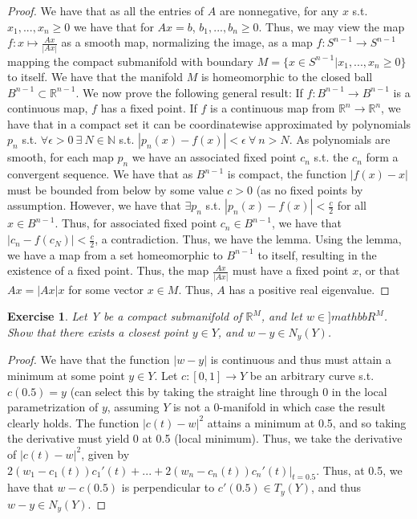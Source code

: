 \documentclass{article}
\newtheorem{exercise}{Exercise}
\begin{document}
  \begin{proof}
    We have that as all the entries of $A$ are nonnegative, for any $x$ s.t. $x_{1},...,x_{n} \geq 0$ we have that for $Ax = b$, $b_{1},...,b_{n} \geq 0$. Thus, we may view the map $f: x \mapsto \frac{Ax}{|Ax|}$ as a smooth map, normalizing the image, as a map $f:S^{n-1} \to S^{n-1}$ mapping the compact submanifold with boundary $M = \{x \in S^{n-1} | x_{1},...,x_{n} \geq 0\}$ to itself. We have that the manifold $M$ is homeomorphic to the closed ball $B^{n-1} \subset \mathbb{R}^{n-1}$. We now prove the following general result: If $f:B^{n-1} \to B^{n-1}$ is a continuous map, $f$ has a fixed point. \newline
    If $f$ is a continuous map from $\mathbb{R}^{n} \to \mathbb{R}^{n}$, we have that in a compact set it can be coordinatewise approximated by polynomials $p_{n}$ s.t. $\forall \epsilon > 0 \ \exists \ N \in \mathbb{N}$ s.t. $|p_{n}(x) - f(x)| < \epsilon \ \forall \ n > N$. As polynomials are smooth, for each map $p_{n}$ we have an associated fixed point $c_{n}$ s.t. the $c_{n}$ form a convergent sequence. We have that as $B^{n-1}$ is compact, the function $|f(x) - x|$ must be bounded from below by some value $c > 0$ (as no fixed points by assumption. However, we have that $\exists p_{n}$ s.t. $|p_{n}(x) - f(x)| < \frac{c}{2}$ for all $x \in B^{n-1}$. Thus, for associated fixed point $c_{n} \in B^{n-1}$, we have that $|c_{n} - f(c_{N})| < \frac{c}{2}$, a contradiction. Thus, we have the lemma.
    Using the lemma, we have a map from a set homeomorphic to $B^{n-1}$ to itself, resulting in the existence of a fixed point. Thus, the map $\frac{Ax}{|Ax|}$ must have a fixed point $x$, or that $Ax = |Ax|x$ for some vector $x \in M$. Thus, $A$ has a positive real eigenvalue. 
  \end{proof}

  \begin{exercise}
    Let Y be a compact submanifold of $\mathbb{R}^{M}$, and let $w \in ]mathbb{R}^{M}$. Show that there exists a closest point $y \in Y$, and $w-y \in N_{y}(Y)$.
    \end{exercise}
    \begin{proof}
      We have that the function $|w-y|$ is continuous and thus must attain a minimum at some point $y \in Y$. Let $c: [0,1] \to Y$ be an arbitrary curve s.t. $c(0.5) = y$ (can select this by taking the straight line through 0 in the local parametrization of $y$, assuming $Y$ is not a 0-manifold in which case the result clearly holds. The function $|c(t) - w|^{2}$ attains a minimum at 0.5, and so taking the derivative must yield 0 at 0.5 (local minimum). Thus, we take the derivative of $|c(t) - w|^{2}$, given by $2(w_{1}-c_{1}(t))c_{1}'(t) + ... + 2(w_{n}-c_{n}(t))c_{n}'(t)\big|_{t = 0.5}$. Thus, at 0.5, we have that $w - c(0.5)$ is perpendicular to $c'(0.5) \in T_{y}(Y)$, and thus $w-y \in N_{y}(Y)$.  
    \end{proof}
\end{document}
